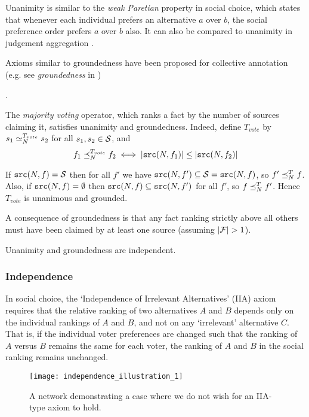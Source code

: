 \documentclass[../main.tex]{subfiles}
\begin{document}
Unanimity is similar to the \emph{weak Paretian} property \cite{handbook_intro}
in social choice, which states that whenever each individual prefers an
alternative $a$ over $b$, the social preference order prefers $a$ over $b$
also. It can also be compared to unanimity in judgement
aggregation \cite{handbook_ja}.

Axioms similar to groundedness have been proposed for collective annotation
(e.g. see \emph{groundedness} in \cite{kruger})

.

\begin{example}
The \emph{majority voting} operator, which ranks a fact by the number of
sources claiming it, satisfies unanimity and groundedness. Indeed, define
$T_{vote}$ by $s_1 \seq_N^{T_{vote}} s_2$ for all $s_1, s_2 \in \S$, and
    $$ f_1 \fle_N^{T_{vote}} f_2 \iff |\src(N, f_1)| \le |\src(N, f_2)| $$

If $\src(N, f) = \S$ then for all $f'$ we have $\src(N, f') \subseteq \S =
\src(N, f)$, so $f' \fle_N^T f$. Also, if $\src(N, f) = \emptyset$ then
$\src(N, f) \subseteq \src(N, f')$ for all $f'$, so $f \fle_N^T f'$. Hence
$T_{vote}$ is unanimous and grounded.
\end{example}

A consequence of groundedness is that any fact ranking strictly above all
others must have been claimed by at least one source (assuming $|\F|>1$).

\begin{proposition}
\label{prop:unam_ground_indep}
Unanimity and groundedness are independent.
\end{proposition}

\subsubsection*{Independence}

In social choice, the `Independence of Irrelevant Alternatives' (IIA) axiom
\cite{arrow} requires that the relative ranking of two alternatives $A$ and $B$
depends only on the individual rankings of $A$ and $B$, and not on any
`irrelevant' alternative $C$. That is, if the individual voter preferences are
changed such that the ranking of $A$ versus $B$ remains the same for each
voter, the ranking of $A$ and $B$ in the social ranking remains unchanged.

\begin{figure}
    \centering
    \texttt{[image: independence\_illustration\_1]}
    \caption{
        A network demonstrating a case where we do not wish for an IIA-type
        axiom to hold.
    }
    \label{img:independence_illustration_1}
\end{figure}
\end{document}
